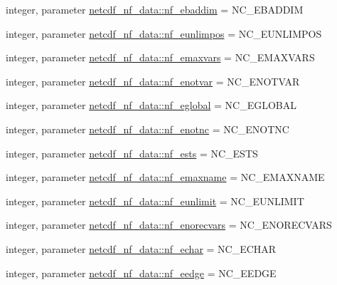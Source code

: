\begin{DoxyCompactItemize}
\item 
integer, parameter \hyperlink{namespacenetcdf__nf__data_ae18a3d3c26e329679ea23b55347f5dab}{netcdf\+\_\+nf\+\_\+data\+::nf\+\_\+ebaddim} = N\+C\+\_\+\+E\+B\+A\+D\+D\+IM
\item 
integer, parameter \hyperlink{namespacenetcdf__nf__data_a4a2ed8a1310a7b608820c2a25ff76725}{netcdf\+\_\+nf\+\_\+data\+::nf\+\_\+eunlimpos} = N\+C\+\_\+\+E\+U\+N\+L\+I\+M\+P\+OS
\item 
integer, parameter \hyperlink{namespacenetcdf__nf__data_ad0b2c48b28569751246f1d01c6658709}{netcdf\+\_\+nf\+\_\+data\+::nf\+\_\+emaxvars} = N\+C\+\_\+\+E\+M\+A\+X\+V\+A\+RS
\item 
integer, parameter \hyperlink{namespacenetcdf__nf__data_acf95cccfbb55ab7c8dc98567c5f8cf27}{netcdf\+\_\+nf\+\_\+data\+::nf\+\_\+enotvar} = N\+C\+\_\+\+E\+N\+O\+T\+V\+AR
\item 
integer, parameter \hyperlink{namespacenetcdf__nf__data_a87eb232cfd09e28ccc6c8e7aa5111a44}{netcdf\+\_\+nf\+\_\+data\+::nf\+\_\+eglobal} = N\+C\+\_\+\+E\+G\+L\+O\+B\+AL
\item 
integer, parameter \hyperlink{namespacenetcdf__nf__data_aece9025a7d5d572776bab7fd9a695a96}{netcdf\+\_\+nf\+\_\+data\+::nf\+\_\+enotnc} = N\+C\+\_\+\+E\+N\+O\+T\+NC
\item 
integer, parameter \hyperlink{namespacenetcdf__nf__data_a9a4217c866473f8f7ef5e22c536fd9aa}{netcdf\+\_\+nf\+\_\+data\+::nf\+\_\+ests} = N\+C\+\_\+\+E\+S\+TS
\item 
integer, parameter \hyperlink{namespacenetcdf__nf__data_ad1f3f1c5e89739c4629d73aa6ddac320}{netcdf\+\_\+nf\+\_\+data\+::nf\+\_\+emaxname} = N\+C\+\_\+\+E\+M\+A\+X\+N\+A\+ME
\item 
integer, parameter \hyperlink{namespacenetcdf__nf__data_a023bee57138b413b8c8c363bd7d9d25f}{netcdf\+\_\+nf\+\_\+data\+::nf\+\_\+eunlimit} = N\+C\+\_\+\+E\+U\+N\+L\+I\+M\+IT
\item 
integer, parameter \hyperlink{namespacenetcdf__nf__data_aa5ac3777afc47e099eccec585f9ef8ff}{netcdf\+\_\+nf\+\_\+data\+::nf\+\_\+enorecvars} = N\+C\+\_\+\+E\+N\+O\+R\+E\+C\+V\+A\+RS
\item 
integer, parameter \hyperlink{namespacenetcdf__nf__data_a6b8d3f930f91dcd4c9ceea47452fd11a}{netcdf\+\_\+nf\+\_\+data\+::nf\+\_\+echar} = N\+C\+\_\+\+E\+C\+H\+AR
\item 
integer, parameter \hyperlink{namespacenetcdf__nf__data_aa1d5011ddf9c06b954161ad52b0d5516}{netcdf\+\_\+nf\+\_\+data\+::nf\+\_\+eedge} = N\+C\+\_\+\+E\+E\+D\+GE
\item 

\end{DoxyCompactItemize}

